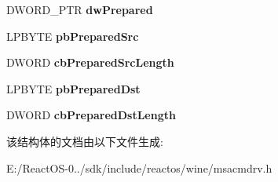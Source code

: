 \begin{DoxyCompactItemize}
\item 
\mbox{\label{struct___a_c_m_d_r_v_s_t_r_e_a_m_h_e_a_d_e_r_aeec015fbe1c248d2f8d603a662c13a7a}} 
D\+W\+O\+R\+D\+\_\+\+P\+TR {\bfseries dw\+Prepared}
\item 
\mbox{\label{struct___a_c_m_d_r_v_s_t_r_e_a_m_h_e_a_d_e_r_a12c6d84ca4cf768902f68e42678122d6}} 
L\+P\+B\+Y\+TE {\bfseries pb\+Prepared\+Src}
\item 
\mbox{\label{struct___a_c_m_d_r_v_s_t_r_e_a_m_h_e_a_d_e_r_a5d17842923c4642bdc7c3a2262f373cb}} 
D\+W\+O\+RD {\bfseries cb\+Prepared\+Src\+Length}
\item 
\mbox{\label{struct___a_c_m_d_r_v_s_t_r_e_a_m_h_e_a_d_e_r_a069a9962c781451d22e8877884a341e8}} 
L\+P\+B\+Y\+TE {\bfseries pb\+Prepared\+Dst}
\item 
\mbox{\label{struct___a_c_m_d_r_v_s_t_r_e_a_m_h_e_a_d_e_r_a2dd647525c99f7714bd17cad4b58d047}} 
D\+W\+O\+RD {\bfseries cb\+Prepared\+Dst\+Length}
\end{DoxyCompactItemize}


该结构体的文档由以下文件生成\+:\begin{DoxyCompactItemize}
\item 
E\+:/\+React\+O\+S-\/0../sdk/include/reactos/wine/msacmdrv.\+h\end{DoxyCompactItemize}
